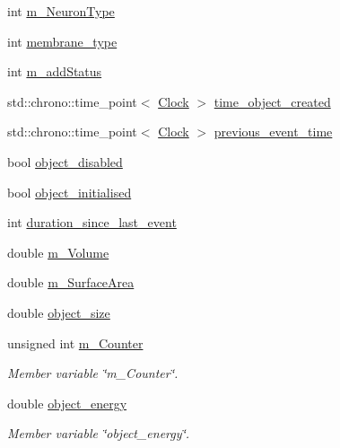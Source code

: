\begin{DoxyCompactItemize}
\item 
int \mbox{\hyperlink{classMembrane_a4ae44a3db559cbae5009c1ec4e63016f}{m\+\_\+\+Neuron\+Type}}
\item 
int \mbox{\hyperlink{classMembrane_ac55bb1eede5e5c54f04c72c4d09dd6b4}{membrane\+\_\+type}}
\item 
int \mbox{\hyperlink{classMembrane_a3d0f00801a39053adff2691816a443e7}{m\+\_\+add\+Status}}
\item 
std\+::chrono\+::time\+\_\+point$<$ \mbox{\hyperlink{universe_8h_a0ef8d951d1ca5ab3cfaf7ab4c7a6fd80}{Clock}} $>$ \mbox{\hyperlink{classMembrane_a44eaaa3b258fc5169c1ece8bf7c9ab32}{time\+\_\+object\+\_\+created}}
\item 
std\+::chrono\+::time\+\_\+point$<$ \mbox{\hyperlink{universe_8h_a0ef8d951d1ca5ab3cfaf7ab4c7a6fd80}{Clock}} $>$ \mbox{\hyperlink{classMembrane_a2decce528a2588104fd75465a077aa2f}{previous\+\_\+event\+\_\+time}}
\item 
bool \mbox{\hyperlink{classMembrane_aca7993094a3bc7b7ba03892b61183e6b}{object\+\_\+disabled}}
\item 
bool \mbox{\hyperlink{classMembrane_aaa2bd265c8d1d3c6ac73b04df4f08216}{object\+\_\+initialised}}
\item 
int \mbox{\hyperlink{classMembrane_a7e2df85f4d5a0aff0b02636e35a4aeaf}{duration\+\_\+since\+\_\+last\+\_\+event}}
\item 
double \mbox{\hyperlink{classMembrane_a8049feca4d942ea33837aac2a13d18b3}{m\+\_\+\+Volume}}
\item 
double \mbox{\hyperlink{classMembrane_a8afe483ca9fa8447e1e05d9405571fe0}{m\+\_\+\+Surface\+Area}}
\item 
double \mbox{\hyperlink{classMembrane_a7e7d0df87bbe5f498e9042fcc687c74f}{object\+\_\+size}}
\item 
unsigned int \mbox{\hyperlink{classMembrane_a341a25633aa7a79f20781075b6c0c2bc}{m\+\_\+\+Counter}}
\begin{DoxyCompactList}\small\item\em Member variable \char`\"{}m\+\_\+\+Counter\char`\"{}. \end{DoxyCompactList}\item 
double \mbox{\hyperlink{classMembrane_a19ef43ccffe8974084f4018b7d539d03}{object\+\_\+energy}}
\begin{DoxyCompactList}\small\item\em Member variable \char`\"{}object\+\_\+energy\char`\"{}. \end{DoxyCompactList}\item 

\end{DoxyCompactItemize}
